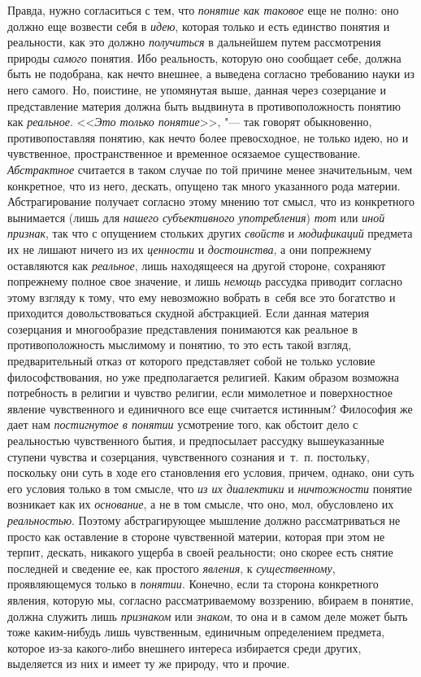 Правда, нужно согласиться с тем, что {\em понятие как таковое}
еще не полно: оно должно еще возвести себя в {\em идею}, которая
только и есть единство понятия и реальности, как это должно
{\em получиться} в дальнейшем путем рассмотрения природы
{\em самого} понятия. Ибо
реальность, которую оно сообщает себе, должна быть не подобрана, как нечто
внешнее, а выведена согласно требованию науки из него самого. Но, поистине,
не упомянутая выше, данная через созерцание и представление материя должна
быть выдвинута в противоположность понятию как {\em реальное}.
<<{\em Это только понятие}>>, "---
так говорят обыкновенно, противопоставляя понятию, как нечто
более превосходное, не только идею, но и чувственное, пространственное и
временное осязаемое существование. {\em Абстрактное}
считается в таком случае по той причине менее значительным,
чем конкретное, что из него, дескать, опущено так много указанного рода
материи. Абстрагирование получает согласно этому мнению тот смысл, что из
конкретного вынимается (лишь для {\em нашего субъективного
употребления}) {\em тот} или {\em иной признак},
так что с опущением стольких других {\em свойств} и {\em модификаций}
предмета их не лишают ничего из их {\em ценности} и {\em достоинства}, а они
попрежнему оставляются как {\em реальное}, лишь находящееся на другой
стороне, сохраняют попрежнему полное свое значение, и лишь {\em немощь}
рассудка приводит согласно этому взгляду к тому, что ему
невозможно вобрать в~себя все это богатство и приходится довольствоваться
скудной абстракцией. Если данная материя созерцания и многообразие
представления понимаются как реальное в противоположность мыслимому и
понятию, то это есть такой взгляд, предварительный отказ от которого
представляет собой не только условие философствования, но уже
предполагается религией. Каким образом возможна потребность в религии и
чувство религии, если мимолетное и поверхностное явление чувственного и
единичного все еще считается истинным? Философия же дает нам
{\em постигнутое в понятии}
усмотрение того, как обстоит дело с реальностью чувственного
бытия, и предпосылает рассудку вышеуказанные ступени чувства и созерцания,
чувственного сознания и~т.~п. постольку, поскольку они суть
в ходе его становления его условия, причем, однако, они суть его условия
только в том смысле, что {\em из их диалектики} и
{\em ничтожности} понятие возникает как их {\em основание},
а не в том смысле, что оно, мол, обусловлено их {\em реальностью}.
Поэтому абстрагирующее мышление должно рассматриваться не
просто как оставление в стороне чувственной материи, которая при этом не
терпит, дескать, никакого ущерба в своей реальности; оно скорее есть снятие
последней и сведение ее, как простого {\em явления}, к {\em существенному},
проявляющемуся только в {\em понятии}. Конечно,
если та сторона конкретного явления, которую мы, согласно рассматриваемому
воззрению, вбираем в понятие, должна служить лишь
{\em признаком} или {\em знаком}, то она и в
самом деле может быть тоже каким-нибудь лишь чувственным, единичным
определением предмета, которое из-за какого-либо внешнего интереса
избирается среди других, выделяется из них и имеет ту же природу, что и прочие.


